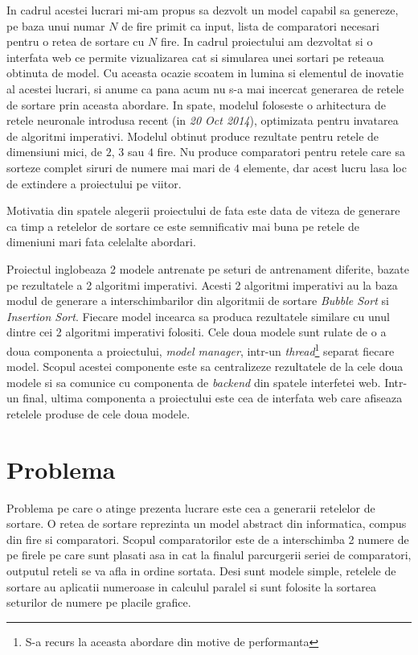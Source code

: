 \documentclass[12pt]{article}
\begin{document}
   In cadrul acestei lucrari mi-am propus sa dezvolt un model capabil sa genereze, pe baza unui numar $N$ de fire primit ca input, lista de comparatori necesari pentru o retea de sortare cu $N$ fire. In cadrul proiectului am dezvoltat si o interfata web ce permite vizualizarea cat si simularea unei sortari pe reteaua obtinuta de model. Cu aceasta ocazie scoatem in lumina si elementul de inovatie al acestei lucrari, si anume ca pana acum nu s-a mai incercat generarea de retele de sortare prin aceasta abordare. In spate, modelul foloseste o arhitectura de retele neuronale introdusa recent (in \textit{20 Oct 2014}), optimizata pentru invatarea de algoritmi imperativi. Modelul obtinut produce rezultate pentru retele de dimensiuni mici, de $2$, $3$ sau $4$ fire. Nu produce comparatori pentru retele care sa sorteze complet siruri de numere mai mari de $4$ elemente, dar acest lucru lasa loc de extindere a proiectului pe viitor.

Motivatia din spatele alegerii proiectului de fata este data de viteza de generare ca timp a retelelor de sortare ce este semnificativ mai buna pe retele de dimeniuni mari fata celelalte abordari.

Proiectul inglobeaza 2 modele antrenate pe seturi de antrenament diferite, bazate pe rezultatele a 2 algoritmi imperativi. Acesti 2 algoritmi imperativi au la baza modul de generare a interschimbarilor din algoritmii de sortare \textit{Bubble Sort} si \textit{Insertion Sort}. Fiecare model incearca sa produca rezultatele similare cu unul dintre cei 2 algoritmi imperativi folositi. Cele doua modele sunt rulate de o a doua componenta a proiectului, \textit{model manager}, intr-un \textit{thread}\footnote{S-a recurs la aceasta abordare din motive de performanta} separat fiecare model. Scopul acestei componente este sa centralizeze rezultatele de la cele doua modele si sa comunice cu componenta de \textit{backend} din spatele interfetei web. Intr-un final, ultima componenta a proiectului este cea de interfata web care afiseaza retelele produse de cele doua modele.

\section{Problema}

Problema pe care o atinge prezenta lucrare este cea a generarii retelelor de sortare. O retea de sortare reprezinta un model abstract din informatica, compus din fire si comparatori. Scopul comparatorilor este de a interschimba 2 numere de pe firele pe care sunt plasati asa in cat la finalul parcurgerii seriei de comparatori, outputul reteli se va afla in ordine sortata. Desi sunt modele simple, retelele de sortare au aplicatii numeroase in calculul paralel si sunt folosite la sortarea seturilor de numere pe placile grafice.
\end{document}
